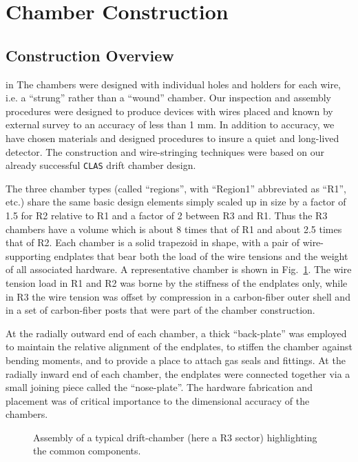 \section{Chamber Construction}

\subsection{Construction Overview}

 in
The chambers were designed with individual holes and holders for
each wire, i.e. a ``strung'' rather than a ``wound'' chamber.  Our 
inspection and assembly procedures were designed to produce devices with 
wires placed and known by external survey to an accuracy of less than 1 mm. 
In addition to accuracy, we have chosen materials and designed 
procedures to insure a quiet and long-lived detector.  The construction 
and wire-stringing techniques were based on our already successful {\tt CLAS} 
drift chamber design.

The three chamber types (called ``regions'', with ``Region1'' abbreviated as ``R1'', etc.)  share the same basic design elements simply
scaled up in size by a factor of 1.5 for R2 relative to R1 and a factor
of 2 between R3 and R1.  Thus the R3 chambers have a volume which is
about 8 times that of R1 and about 2.5 times that of R2.  
Each chamber is a solid trapezoid in shape, with  
a pair of wire-supporting endplates that bear both the load of the 
wire tensions and the weight of all associated hardware. A representative 
chamber is shown in Fig.~\ref{generic-chamber-sketch}.  The wire tension load in
R1 and R2 was borne by the stiffness of the endplates only, while in
R3 the wire tension was offset 
by compression in a carbon-fiber outer shell and in a set of carbon-fiber 
posts that were part of the chamber construction.  

At the radially outward end of each chamber, a thick ``back-plate'' was 
employed to maintain the relative 
alignment of the endplates, to stiffen the chamber against bending moments, 
and to provide a place to attach gas seals and fittings. At the radially inward 
end of each chamber, the endplates were connected together via a small joining 
piece called the ``nose-plate''.  The hardware fabrication and placement 
was of critical importance to the dimensional accuracy of the chambers.

\begin{figure}[htpb]   
\vspace{4.5cm}

\caption{\small{Assembly of a typical drift-chamber
(here a R3 sector) highlighting the common components.}}
\label{generic-chamber-sketch}
\end{figure}   

